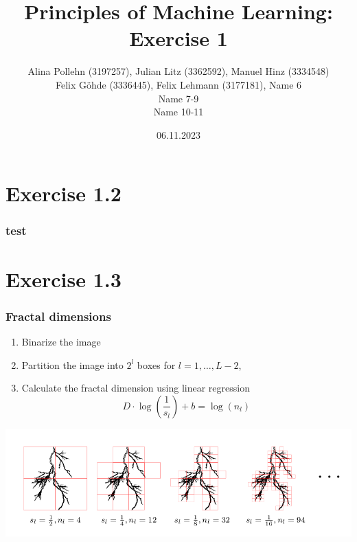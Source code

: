 \documentclass[10pt,aspectratio=169,handout]{beamer}
\begin{document}
\title{Principles of Machine Learning: Exercise 1}
\date{06.11.2023}
\author{Alina Pollehn (3197257), Julian Litz (3362592), Manuel Hinz (3334548)\\Felix Göhde (3336445), Felix Lehmann (3177181), Name 6 \\Name 7-9\\ Name 10-11}

\begin{frame}
    \maketitle
\end{frame}

\section{Exercise 1.2}

\begin{frame}
    \frametitle{test}
\end{frame}


\section{Exercise 1.3}

\begin{frame}
    \frametitle{Fractal dimensions}

    \begin{enumerate}
        \item Binarize the image
        \item Partition the image into $2^l$ boxes for $l=1,\dots,L-2$,
        \item Calculate the fractal dimension using linear regression \[D\cdot \log\left(\frac{1}{s_l}\right)+b=\log(n_l)\] 
    \end{enumerate}    
    \includegraphics[scale=0.4]{images/boxes.png}

\end{frame}
\end{document}
